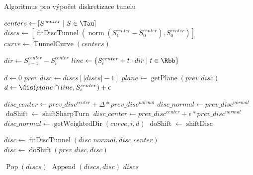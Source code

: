\begin{algorithm}
\caption{Algoritmus pro výpočet diskretizace tunelu}
\label{alg:digTunnel}
\begin{algorithmic}[1]

    \State $ centers \gets [ S^{center} \mid S \in \Tau ] $ \label{digTunnel:first_init}
    \
    \State $ discs \gets   [ \operatorname{fitDiscTunnel}(\operatorname{norm}(S_{1}^{center} - S_{0}^{center}), S_0^{center})] $
    \State $ curve \gets \operatorname{TunnelCurve}(centers) $ \label{digTunnel:last_init}
    \Statex

        \State $ dir \gets S_{i + 1}^{center} - S_{i}^{center} $
        \State $ line \gets \{ S_{i}^{center} + t\cdot dir \mid t \in \Rbb \} $

        \State $ d \gets 0 $
            \State $ prev\_disc \gets discs[|discs|-1] $
            \State $ plane \gets \operatorname{getPlane}(prev\_disc) $ 
            \State $ d \gets \dis(plane \cap line, S_{i}^{center}) + \epsilon  $
            \If {$ d > \norm{dir} $} \label{digTunnel:while_condition}
                \Break
            \EndIf
            \Statex

                \State $ disc\_center
                    \gets prev\_disc^{center} + \Delta * prev\_disc^{normal} $ \label{alg:shift_by_delta}
                \State $ disc\_normal \gets prev\_disc^{normal} $   \label{alg:same_normal}
                \State $ \operatorname{doShift} \gets \operatorname{shiftSharpTurn} $
            \Else
                \State $ disc\_center \gets prev\_disc^{center} + \epsilon * prev\_disc^{normal} $
                \State $ disc\_normal \gets \operatorname{getWeightedDir}(curve, i, d) $
                \State $ \operatorname{doShift} \gets \operatorname{shiftDisc} $
            \EndIf

            \State $ disc \gets \operatorname{fitDiscTunnel}(disc\_normal, disc\_center) $ \label{alg:fit_disk}
            \State $ disc \gets \operatorname{doShift}(prev\_disc, disc) $ \label{alg:shift_disk}

             \label{digTunnel:last_if}
                \State $ \operatorname{Pop}(discs)  $ \label{digTunnel:last_if_end}
            \EndIf
            \State $ \operatorname{Append}(discs, disc) $
        \EndWhile
    \EndFor
    \State \Return $ discs $
\EndFunction

\end{algorithmic}
\end{algorithm}

